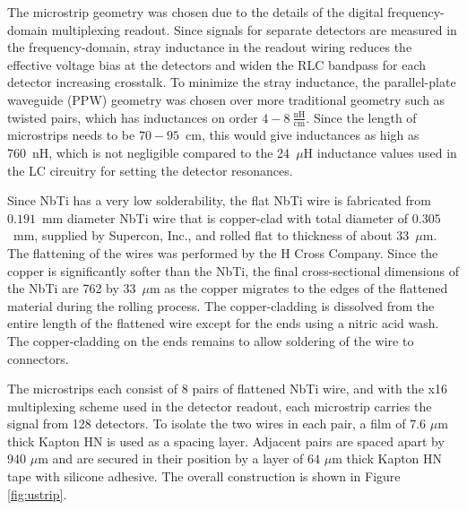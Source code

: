 \documentclass[../EBEXPaper2.tex]{subfiles}
\begin{document}
The microstrip geometry was chosen due to the details of the digital frequency-domain multiplexing readout.
Since signals for separate detectors are measured in the frequency-domain, stray inductance in the readout wiring reduces the effective voltage bias at the detectors and widen the RLC bandpass for each detector increasing crosstalk.
To minimize the stray inductance, the parallel-plate waveguide (PPW) geometry was chosen over more traditional geometry such as twisted pairs, which has inductances on order $4-8\ \frac{\mathrm{nH}}{\mathrm{cm}}$.
Since the length of microstrips needs to be $70-95$~cm, this would give inductances as high as 760~nH, which is not negligible compared to the 24~$\mu$H inductance values used in the LC circuitry for setting the detector resonances. %

Since NbTi has a very low solderability, the flat NbTi wire is fabricated from $0.191$~mm diameter NbTi wire that is copper-clad with total diameter of $0.305$~mm, supplied by Supercon, Inc., and rolled flat to thickness of about 33~$\mu$m.
The flattening of the wires was performed by the H Cross Company.
Since the copper is significantly softer than the NbTi, the final cross-sectional dimensions of the NbTi are 762 by 33~$\mu$m as the copper migrates to the edges of the flattened material during the rolling process.
The copper-cladding is dissolved from the entire length of the flattened wire except for the ends using a nitric acid wash.
The copper-cladding on the ends remains to allow soldering of the wire to connectors.

The microstrips each consist of 8 pairs of flattened NbTi wire, and with the x16 multiplexing scheme used in the detector readout, each microstrip carries the signal from 128 detectors.
To isolate the two wires in each pair, a film of $7.6$ $\mu$m thick Kapton HN is used as a spacing layer.
Adjacent pairs are spaced apart by $940$ $\mu$m and are secured in their position by a layer of $64$ $\mu$m thick Kapton HN tape with silicone adhesive.
The overall construction is shown in Figure \ref{fig:ustrip}. %
\end{document}
